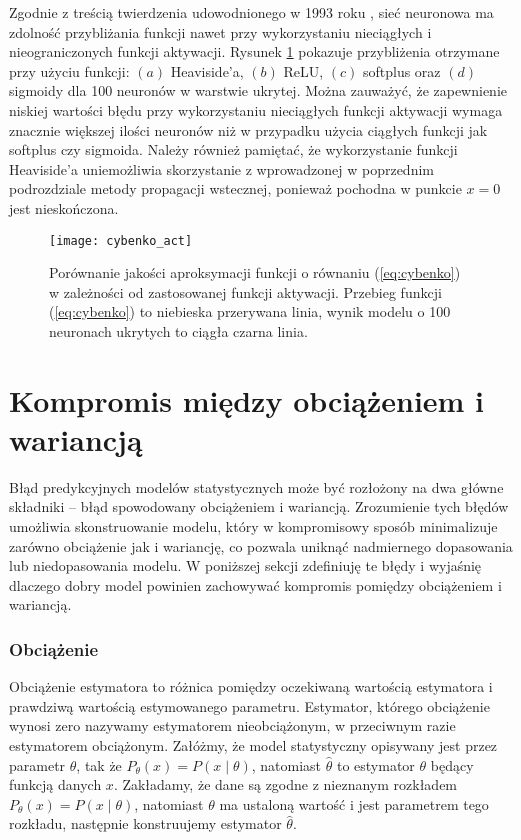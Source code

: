 \documentclass[11pt]{book}
\theoremstyle{definition}
\begin{document}
Zgodnie z treścią twierdzenia udowodnionego w 1993 roku \cite{Leshno1993MultilayerFN}, sieć neuronowa ma zdolność przybliżania funkcji nawet przy wykorzystaniu nieciągłych i nieograniczonych funkcji aktywacji. Rysunek \ref{fig:cybenko3} pokazuje przybliżenia otrzymane przy użyciu funkcji: $(a)$ Heaviside'a, $(b)$ ReLU, $(c)$ softplus oraz $(d)$ sigmoidy dla 100 neuronów w warstwie ukrytej. Można zauważyć, że zapewnienie niskiej wartości błędu przy wykorzystaniu nieciągłych funkcji aktywacji wymaga znacznie większej ilości neuronów niż w przypadku użycia ciągłych funkcji jak softplus czy sigmoida. Należy również pamiętać, że wykorzystanie funkcji Heaviside'a uniemożliwia skorzystanie z wprowadzonej w poprzednim podrozdziale metody propagacji wstecznej, ponieważ pochodna w punkcie $x=0$ jest nieskończona.
%	
\begin{figure}[h!]
	\centering
	\texttt{[image: cybenko\_act]}
	\caption{Porównanie jakości aproksymacji funkcji o równaniu (\ref{eq:cybenko}) w zależności od zastosowanej funkcji aktywacji. Przebieg funkcji (\ref{eq:cybenko}) to niebieska przerywana linia, wynik modelu o 100 neuronach ukrytych to ciągła czarna linia.}
		 \label{fig:cybenko3}
\end{figure}

\section{Kompromis między obciążeniem i wariancją}


Błąd predykcyjnych modelów statystycznych może być rozłożony na dwa główne składniki -- błąd spowodowany obciążeniem i wariancją. Zrozumienie tych błędów umożliwia skonstruowanie modelu, który w kompromisowy sposób minimalizuje zarówno obciążenie jak i wariancję, co pozwala uniknąć nadmiernego dopasowania lub niedopasowania modelu. W poniższej sekcji zdefiniuję te błędy i wyjaśnię dlaczego dobry model powinien zachowywać kompromis pomiędzy obciążeniem i wariancją.


\subsubsection{Obciążenie}
Obciążenie estymatora to różnica pomiędzy oczekiwaną wartością estymatora i prawdziwą wartością estymowanego parametru. Estymator, którego obciążenie wynosi zero nazywamy estymatorem nieobciążonym, w przeciwnym razie estymatorem obciążonym. Załóżmy, że model statystyczny opisywany jest przez parametr $\theta$, tak że $P_{\theta }(x)=P(x\mid \theta)$, natomiast $\hat{\theta}$ to estymator $\theta$ będący funkcją danych $x$. Zakładamy, że dane są zgodne z nieznanym rozkładem $P_{\theta }(x)=P(x\mid \theta)$, natomiast $\theta$ ma ustaloną wartość i jest parametrem tego rozkładu, następnie konstruujemy estymator $\hat{\theta}$.
\end{document}
